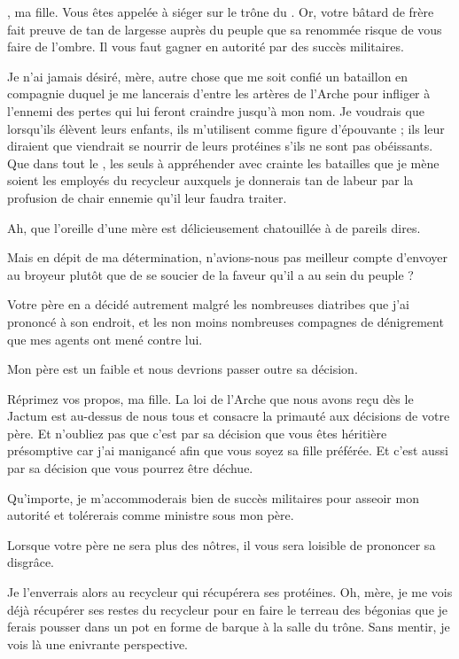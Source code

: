 \begin{drama}
  \reinespeaks \princesse, ma fille. Vous êtes appelée à siéger sur le trône du \campprincipal{}. Or, votre bâtard de frère fait preuve de tan de largesse auprès du peuple que sa renommée risque de vous faire de l’ombre. Il vous faut gagner en autorité par des succès militaires.

  \princessespeaks Je n’ai jamais désiré, mère, autre chose que me soit confié un bataillon en compagnie duquel je me lancerais d’entre les artères de l’Arche pour infliger à l’ennemi des pertes qui lui feront craindre jusqu’à mon nom. Je voudrais que lorsqu’ils élèvent leurs enfants, ils m’utilisent comme figure d’épouvante ; ils leur diraient que \princesse{}  viendrait se nourrir de leurs protéines s’ils ne sont pas obéissants. Que dans tout le \campprincipal{}, les seuls à appréhender avec crainte les batailles que je mène soient les employés du recycleur auxquels je donnerais tan de labeur par la profusion de chair ennemie qu’il leur faudra traiter.

  \reinespeaks Ah, que l’oreille d’une mère est délicieusement chatouillée à de pareils dires.

  \princessespeaks Mais en dépit de ma détermination, n’avions-nous pas meilleur compte d’envoyer \elena{} au broyeur plutôt que de se soucier de la faveur qu’il a au sein du peuple ?

  \reinespeaks Votre père en a décidé autrement malgré les nombreuses diatribes que j’ai prononcé à son endroit, et les non moins nombreuses compagnes de dénigrement que mes agents ont mené contre lui.

  \princessespeaks Mon père est un faible et nous devrions passer outre sa décision.

  \reinespeaks Réprimez vos propos, ma fille. La loi de l’Arche que nous avons reçu dès le Jactum est au-dessus de nous tous et consacre la primauté aux décisions de votre père. Et n’oubliez pas que c’est par sa décision que vous êtes héritière présomptive car j’ai manigancé afin que vous soyez sa fille préférée. Et c’est aussi par sa décision que vous pourrez être déchue.

  \princessespeaks Qu’importe, je m’accommoderais bien de succès militaires pour asseoir mon autorité et tolérerais \elena{} comme ministre sous mon père.

  \reinespeaks Lorsque votre père ne sera plus des nôtres, il vous sera loisible de prononcer sa disgrâce.

  \princessespeaks Je %
  l’enverrais alors au recycleur qui récupérera ses protéines. Oh, mère, je me vois déjà récupérer ses restes du recycleur pour en faire le terreau des bégonias que je ferais pousser dans un pot en forme de barque à la salle du trône. Sans mentir, je vois là une enivrante perspective.


\end{drama}
